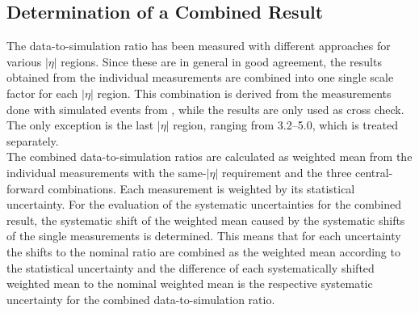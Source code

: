 \subsection{Determination of a Combined Result}
\label{subsec:jer_combination}
The data-to-simulation ratio has been measured with different approaches for various $|\eta|$ regions. Since these are in general in good agreement, the results obtained from the individual measurements are combined into one single scale factor for each $|\eta|$ region. This combination is derived from the measurements done with simulated events from \pythia, while the \herwig results are only used as cross check. The only exception is the last $|\eta|$ region, ranging from 3.2--5.0, which is treated separately. \\
The combined data-to-simulation ratios are calculated as weighted mean from the individual measurements with the same-$|\eta|$ requirement and the three central-forward combinations. Each measurement is weighted by its statistical uncertainty. For the evaluation of the systematic uncertainties for the combined result, the systematic shift of the weighted mean caused by the systematic shifts of the single measurements is determined. This means that for each uncertainty the shifts to the nominal ratio are combined as the weighted mean according to the statistical uncertainty and the difference of each systematically shifted weighted mean to the nominal weighted mean is the respective systematic uncertainty for the combined data-to-simulation ratio. 
\begin{table}[!p]
\centering
\caption{Measured data-to-simulation ratio in various $|\eta|$ regions with statistical and systematic uncertainty as well as the total uncertainty.}
\label{tab:result}
\end{table} 
